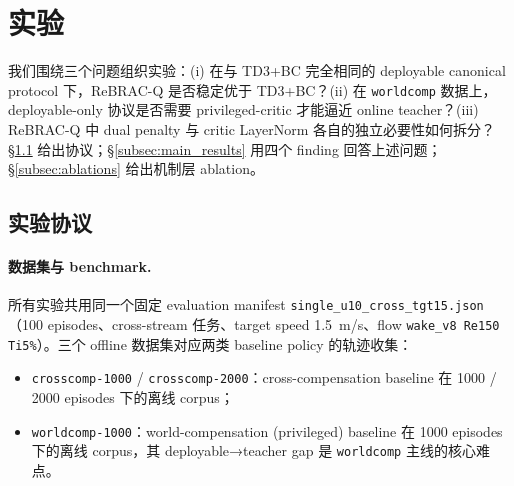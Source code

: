 
\section{实验}
\label{sec:experiments}

我们围绕三个问题组织实验：(i) 在与 TD3+BC \citep{fujimoto2021td3bc} 完全相同的 deployable canonical protocol 下，ReBRAC-Q 是否稳定优于 TD3+BC？(ii) 在 \texttt{worldcomp} 数据上，deployable-only 协议是否需要 privileged-critic 才能逼近 online teacher？(iii) ReBRAC-Q 中 dual penalty 与 critic LayerNorm 各自的独立必要性如何拆分？\S\ref{subsec:protocol} 给出协议；\S\ref{subsec:main_results} 用四个 finding 回答上述问题；\S\ref{subsec:ablations} 给出机制层 ablation。

\subsection{实验协议}
\label{subsec:protocol}

\paragraph{数据集与 benchmark.}
所有实验共用同一个固定 evaluation manifest \texttt{single\_u10\_cross\_tgt15.json}（100 episodes、cross-stream 任务、target speed \SI{1.5}{m/s}、flow \texttt{wake\_v8 Re150 Ti5\%}）。三个 offline 数据集对应两类 baseline policy 的轨迹收集：
\begin{itemize}
    \item \texttt{crosscomp-1000} / \texttt{crosscomp-2000}：cross-compensation baseline 在 1000 / 2000 episodes 下的离线 corpus；
    \item \texttt{worldcomp-1000}：world-compensation (privileged) baseline 在 1000 episodes 下的离线 corpus，其 deployable→teacher gap 是 \texttt{worldcomp} 主线的核心难点。
\end{itemize}


